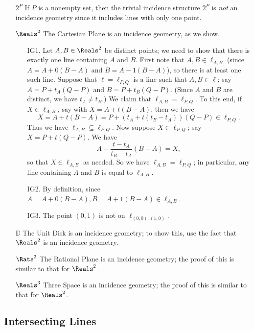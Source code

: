 \documentclass{article}
\begin{document}
\begin{itemize}
\item[$2^P$] If $P$ is a nonempty set, then the trivial incidence structure $2^P$ is \emph{not} an incidence geometry since it includes lines with only one point.

\item[$\Reals^2$] The Cartesian Plane is an incidence geometry, as we show.
\begin{itemize}
\item[IG1.] Let $A,B \in \Reals^2$ be distinct points; we need to show that there is exactly one line containing $A$ and $B$. First note that $A,B \in \ell_{A,B}$ (since $A = A + 0(B-A)$ and $B = A - 1(B-A)$), so there is at least one such line. Suppose that $\ell = \ell_{P,Q}$ is a line such that $A,B \in \ell$; say $A = P + t_A(Q-P)$ and $B = P + t_B(Q-P)$. (Since $A$ and $B$ are distinct, we have $t_A \neq t_B$.) We claim that $\ell_{A,B} = \ell_{P,Q}$. To this end, if $X \in \ell_{A,B}$, say with $X = A + t(B-A)$, then we have \[X = A + t(B-A) = P + (t_A + t(t_B - t_A))(Q-P) \in \ell_{P,Q}. \] Thus we have $\ell_{A,B} \subseteq \ell_{P,Q}$. Now suppose $X \in \ell_{P,Q}$; say $X = P + t(Q-P)$. We have \[ A + \frac{t-t_A}{t_B-t_A}(B-A) = X, \] so that $X \in \ell_{A,B}$ as needed. So we have $\ell_{A,B} = \ell_{P,Q}$; in particular, any line containing $A$ and $B$ is equal to $\ell_{A,B}$.
\item[IG2.] By definition, since $A = A + 0(B-A), B = A + 1(B-A) \in \ell_{A,B}$.
\item[IG3.] The point $(0,1)$ is not on $\ell_{(0,0),(1,0)}$.
\end{itemize}

\item[$\mathbb{D}$] The Unit Disk is an incidence geometry; to show this, use the fact that $\Reals^2$ is an incidence geometry.

\item[$\Rats^2$] The Rational Plane is an incidence geometry; the proof of this is similar to that for $\Reals^2$.

\item[$\Reals^3$] Three Space is an incidence geometry; the proof of this is similar to that for $\Reals^2$.
\end{itemize}



\subsection*{Intersecting Lines}
\end{document}
